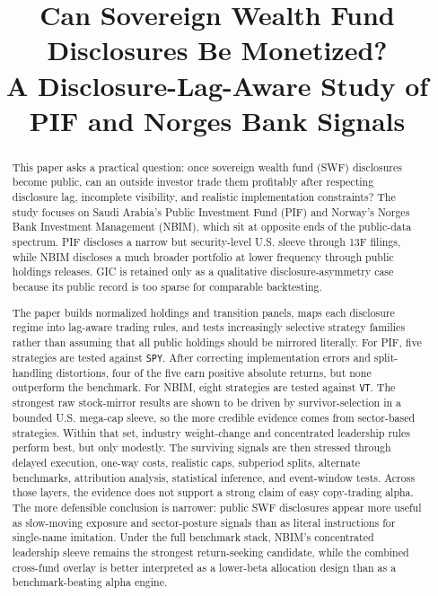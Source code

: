 \documentclass[conference]{IEEEtran}
\title{Can Sovereign Wealth Fund Disclosures Be Monetized?\\
A Disclosure-Lag-Aware Study of PIF and Norges Bank Signals}
\author{
\IEEEauthorblockN{Ethan Wei}
\IEEEauthorblockA{GAO Capital\\
Singapore}
}
\begin{document}
\raggedbottom
\maketitle

\begin{abstract}
This paper asks a practical question: once sovereign wealth fund (SWF) disclosures become public, can an outside investor trade them profitably after respecting disclosure lag, incomplete visibility, and realistic implementation constraints? The study focuses on Saudi Arabia's Public Investment Fund (PIF) and Norway's Norges Bank Investment Management (NBIM), which sit at opposite ends of the public-data spectrum. PIF discloses a narrow but security-level U.S. sleeve through 13F filings, while NBIM discloses a much broader portfolio at lower frequency through public holdings releases. GIC is retained only as a qualitative disclosure-asymmetry case because its public record is too sparse for comparable backtesting.

The paper builds normalized holdings and transition panels, maps each disclosure regime into lag-aware trading rules, and tests increasingly selective strategy families rather than assuming that all public holdings should be mirrored literally. For PIF, five strategies are tested against \texttt{SPY}. After correcting implementation errors and split-handling distortions, four of the five earn positive absolute returns, but none outperform the benchmark. For NBIM, eight strategies are tested against \texttt{VT}. The strongest raw stock-mirror results are shown to be driven by survivor-selection in a bounded U.S. mega-cap sleeve, so the more credible evidence comes from sector-based strategies. Within that set, industry weight-change and concentrated leadership rules perform best, but only modestly. The surviving signals are then stressed through delayed execution, one-way costs, realistic caps, subperiod splits, alternate benchmarks, attribution analysis, statistical inference, and event-window tests. Across those layers, the evidence does not support a strong claim of easy copy-trading alpha. The more defensible conclusion is narrower: public SWF disclosures appear more useful as slow-moving exposure and sector-posture signals than as literal instructions for single-name imitation. Under the full benchmark stack, NBIM's concentrated leadership sleeve remains the strongest return-seeking candidate, while the combined cross-fund overlay is better interpreted as a lower-beta allocation design than as a benchmark-beating alpha engine.
\end{abstract}
\end{document}
